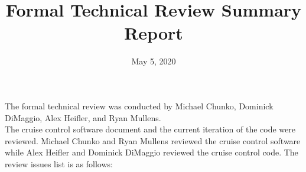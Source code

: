 \documentclass{article}
\title{Formal Technical Review Summary Report}
\date{May 5, 2020}
\begin{document}
	
	\pagestyle{plain}
	\maketitle
	
	\indent The formal technical review was conducted by Michael Chunko, Dominick DiMaggio, Alex Heifler, and Ryan Mullens. \\
	
	The cruise control software document and the current iteration of the code were reviewed. Michael Chunko and Ryan Mullens reviewed the cruise control software while Alex Heifler and Dominick DiMaggio reviewed the cruise control code. The review issues list is as follows: \\
	
\end{document}
